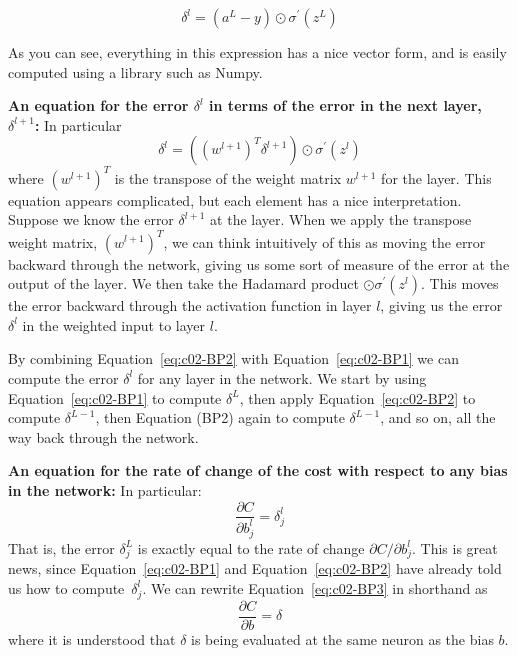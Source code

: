 \begin{equation}
\delta^{l}=\left(a^{L}-y\right) \odot \sigma^{\prime}\left(z^{L}\right)
\label{eq:c02-30}
\end{equation}

As you can see, everything in this expression has a nice vector form, and is easily computed using a library such as Numpy.

\textbf{An equation for the error $\delta^{l}$ in terms of the error in the next layer, $\delta^{l+1}$: }
In particular 
\begin{equation}
\delta^{l}=\left(\left(w^{l+1}\right)^{T} \delta^{l+1}\right) \odot \sigma^{\prime}\left(z^{l}\right)
\label{eq:c02-BP2}
\end{equation}
where $(w^{l+1})^T$ is the transpose of the weight matrix $w^{l+1}$ for the  layer. This equation appears complicated, but each element has a nice interpretation. Suppose we know the error $\delta^{l+1}$ at the  layer. When we apply the transpose weight matrix, $(w^{l+1})^T$, we can think intuitively of this as moving the error backward through the network, giving us some sort of measure of the error at the output of the  layer. We then take the Hadamard product $\odot \sigma^{\prime}\left(z^{l}\right)$. This moves the error backward through the activation function in layer $l$, giving us the error $\delta^{l}$ in the weighted input to layer $l$.

By combining Equation~\ref{eq:c02-BP2} with Equation~\ref{eq:c02-BP1} we can compute the error $\delta^{l}$
for any layer in the network. We start by using Equation~\ref{eq:c02-BP1} to compute  $\delta^{L}$, then apply Equation~\ref{eq:c02-BP2} to compute  $\delta^{L-1}$, then Equation (BP2) again to compute  $\delta^{L-1}$, and so on, all the way back through the network.


\textbf{An equation for the rate of change of the cost with respect to any bias in the network:} In particular: 
\begin{equation}
\frac{\partial C}{\partial b_{j}^{l}}=\delta_{j}^{l}
\label{eq:c02-BP3}
\end{equation}
That is, the error $\delta_{j}^{L}$ is exactly equal to the rate of change $\partial C / \partial b_{j}^{l}$. This is great news, since Equation~\ref{eq:c02-BP1} and Equation~\ref{eq:c02-BP2} have already told us how to compute~$\delta^{l}_j$. We can rewrite Equation~\ref{eq:c02-BP3} in shorthand as 
\begin{equation}
\frac{\partial C}{\partial b}=\delta
\label{eq:c02-31}
\end{equation}
where it is understood that $\delta$ is being evaluated at the same neuron as the bias $b$.

